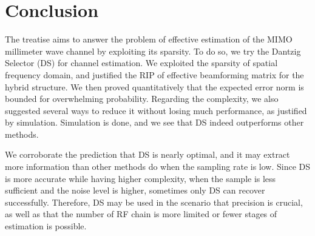 
\chapter {Conclusion}

The treatise aims to answer the problem of effective estimation of the MIMO millimeter wave channel by exploiting its sparsity.
To do so, we try the Dantzig Selector (DS) for channel estimation.
We exploited the sparsity of spatial frequency domain, and justified the RIP of effective beamforming matrix for the hybrid structure.
We then proved quantitatively that the expected error norm is bounded for overwhelming probability.
Regarding the complexity, we also suggested several ways to reduce it without losing much performance, as justified by simulation.
Simulation is done, and we see that DS indeed outperforms other methods.

We corroborate the prediction that DS is nearly optimal, and it may extract more information than other methods do when the sampling rate is low.
Since DS is more accurate while having higher complexity, when the sample is less sufficient and the noise level is higher, sometimes only DS can recover successfully.
Therefore, DS may be used in the scenario that precision is crucial, as well as that the number of RF chain is more limited or fewer stages of estimation is possible.

